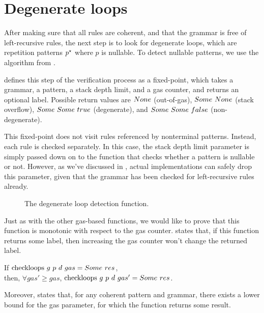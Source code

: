 \section{Degenerate loops}

After making sure that
all rules are coherent,
and that the grammar is free of left-recursive rules,
the next step is to look for degenerate loops,
which are repetition patterns $p^\star$
where $p$ is nullable.
To detect nullable patterns,
we use the algorithm from
.

defines this step of the verification process
as a fixed-point,
which takes a grammar,
a pattern,
a stack depth limit,
and a gas counter,
and returns an optional label.
Possible return values are
$None$ (out-of-gas),
$Some\ None$ (stack overflow),
$Some\ Some\ true$ (degenerate),
and $Some\ Some\ false$ (non-degenerate).

This fixed-point does not visit rules
referenced by nonterminal patterns.
Instead, each rule is checked separately.
In this case, the stack depth limit parameter
is simply passed down on to the function that
checks whether a pattern is nullable or not.
However, as we've discussed in ,
actual implementations can safely drop this parameter,
given that the grammar has been checked
for left-recursive rules already.

\begin{figure}
    \centering
    
    \caption{The degenerate loop detection function.}
    \label{fig:checkloops-function}
\end{figure}

Just as with the other gas-based functions,
we would like to prove that this function
is monotonic with respect to the gas counter.
states that, if this function returns some label,
then increasing the gas counter
won't change the returned label.

\begin{lemma}%
    If $\text{checkloops}\ g\ p\ d\ gas = Some\ res$, \\
    then, $\forall gas' \ge gas$,
    $\text{checkloops}\ g\ p\ d\ gas' = Some\ res$.
    \label{lemma:checkloops-gas-monotonicity}
\end{lemma}

Moreover, 
states that, for any coherent pattern and grammar,
there exists a lower bound for the gas parameter,
for which the function returns some result.

